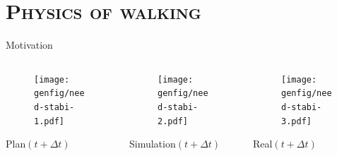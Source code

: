 \documentclass[9pt, aspectratio=43]{beamer}
\begin{document}

\section*{\textsc{Physics of walking}}


\begin{frame}{Motivation}
    \begin{columns}
        \begin{column}{0.32\textwidth}
            \begin{figure}
                \centering
                \texttt{[image: genfig/need-stabi-1.pdf]}
            \end{figure}
            \begin{center}
                Plan$(t + \Delta t)$
            \end{center}
        \end{column}
        \begin{column}{0.33\textwidth}
            \begin{figure}
                \centering
                \texttt{[image: genfig/need-stabi-2.pdf]}
            \end{figure}
            \begin{center}
                Simulation$(t + \Delta t)$
            \end{center}
        \end{column}
        \begin{column}{0.32\textwidth}
            \begin{figure}
                \centering
                \texttt{[image: genfig/need-stabi-3.pdf]}
            \end{figure}
            \begin{center}
                Real$(t + \Delta t)$
            \end{center}
        \end{column}
    \end{columns}
\end{frame}
\end{document}

